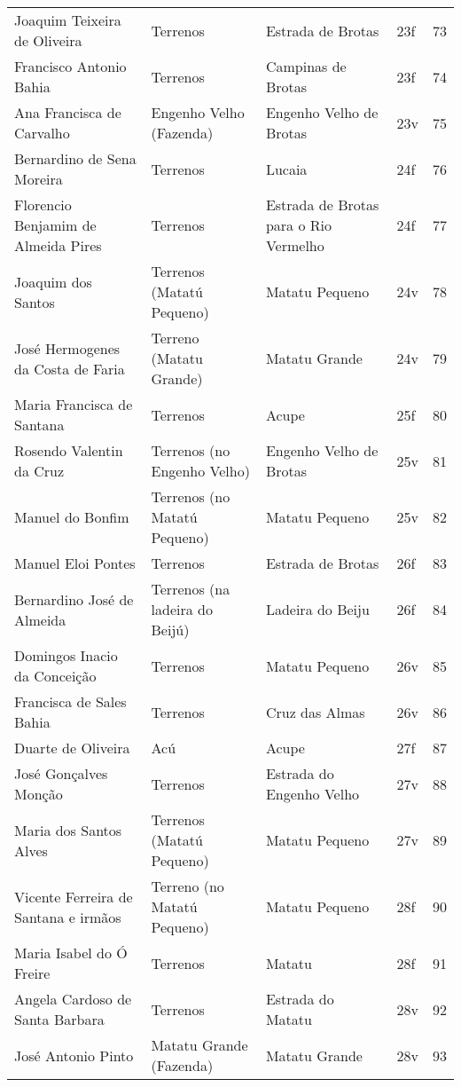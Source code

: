 \begin{table}
{\begin{minipage}{\textwidth}
\begin{tiny}
\begin{tabular}{p{4cm}p{4cm}p{4cm}ll}
Joaquim Teixeira de Oliveira							&Terrenos				&Estrada de Brotas			&23f			&73			\\
Francisco Antonio Bahia								&Terrenos				&Campinas de Brotas			&23f			&74			\\
Ana Francisca de Carvalho							&Engenho Velho (Fazenda)		&Engenho Velho de Brotas		&23v			&75			\\
Bernardino de Sena Moreira							&Terrenos				&Lucaia					&24f			&76			\\
Florencio Benjamim de Almeida Pires						&Terrenos				&Estrada de Brotas para o Rio Vermelho	&24f			&77			\\
Joaquim dos Santos								&Terrenos (Matatú Pequeno)		&Matatu Pequeno				&24v			&78			\\
José Hermogenes da Costa de Faria						&Terreno (Matatu Grande)		&Matatu Grande				&24v			&79			\\
Maria Francisca de Santana							&Terrenos				&Acupe					&25f			&80			\\
Rosendo Valentin da Cruz							&Terrenos (no Engenho Velho)		&Engenho Velho de Brotas		&25v			&81			\\
Manuel do Bonfim								&Terrenos (no Matatú Pequeno)		&Matatu Pequeno				&25v			&82			\\
Manuel Eloi Pontes								&Terrenos				&Estrada de Brotas			&26f			&83			\\
Bernardino José de Almeida							&Terrenos (na ladeira do Beijú)		&Ladeira do Beiju			&26f			&84			\\
Domingos Inacio da Conceição							&Terrenos				&Matatu Pequeno				&26v			&85			\\
Francisca de Sales Bahia							&Terrenos				&Cruz das Almas				&26v			&86			\\
Duarte de Oliveira								&Acú					&Acupe					&27f			&87			\\
José Gonçalves Monção								&Terrenos				&Estrada do Engenho Velho		&27v			&88			\\
Maria dos Santos Alves								&Terrenos (Matatú Pequeno)		&Matatu Pequeno				&27v			&89			\\
Vicente Ferreira de Santana e irmãos						&Terreno (no Matatú Pequeno)		&Matatu Pequeno				&28f			&90			\\
Maria Isabel do Ó Freire							&Terrenos				&Matatu					&28f			&91			\\
Angela Cardoso de Santa Barbara							&Terrenos				&Estrada do Matatu			&28v			&92			\\
José Antonio Pinto								&Matatu Grande (Fazenda)		&Matatu Grande				&28v			&93			\\

\end{tabular}
\end{tiny}
\end{minipage}}
\end{table}
